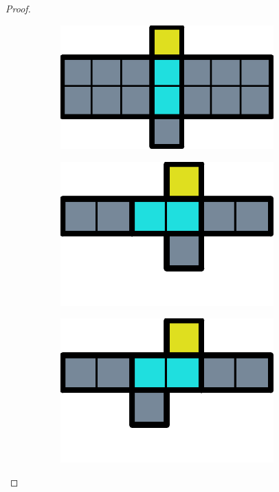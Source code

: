 \begin{proof}
\begin{figure}[ht]
\begin{subfigure}[b]{0.15\textwidth}
    \caption{}
    \label{floating:c}
  \end{subfigure}
  \begin{subfigure}[b]{0.15\textwidth}
    \centering
    \includegraphics[width=0.9\textwidth]{./pictures/dominoes/proff-floating/scenario-4.pdf}
    \caption{}
    \label{floating:d}
  \end{subfigure}
  \begin{subfigure}[b]{0.15\textwidth}
    \centering
    \includegraphics[width=0.9\textwidth]{./pictures/dominoes/proff-floating/scenario-5.pdf}
    \caption{}
    \label{floating:e}
  \end{subfigure}
  \linebreak
  \begin{subfigure}[b]{0.15\textwidth}
    \centering
    \includegraphics[width=0.9\textwidth]{./pictures/dominoes/proff-floating/scenario-6.pdf}

\end{subfigure}
\end{figure}
\end{proof}

